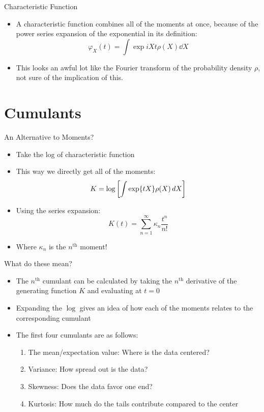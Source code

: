 \documentclass{beamer}
\begin{document}
\begin{frame}{Characteristic Function}
  \begin{itemize}
  \item A characteristic function combines all of the moments at once, because of the power series expansion of the exponential in its definition:
    \begin{equation}
      \varphi_X(t)=\int\exp{iXt}\rho(X)\dd{X}
    \end{equation}
  \item This looks an awful lot like the Fourier transform of the probability density $\rho$, not sure of the implication of this.
  \end{itemize}
\end{frame}

\section{Cumulants}
\begin{frame}{An Alternative to Moments?}
  \begin{itemize}
  \item Take the log of characteristic function
  \item This way we directly get all of the moments:
    \begin{equation}
      K=\log\qty[\int\exp{tX}\rho(X)\dd{X}]
    \end{equation}
  \item Using the series expansion:
    \begin{equation}
      K(t)=\sum_{n=1}^\infty\kappa_n\frac{t^n}{n!}
    \end{equation}
  \item Where $\kappa_n$ is the $n^\text{th}$ moment!
  \end{itemize}
\end{frame}
\begin{frame}{What do these mean?}
  \begin{itemize}
  \item The $n^\text{th}$ cumulant can be calculated by taking the $n^\text{th}$ derivative of the generating function $K$ and evaluating at $t=0$
  \item Expanding the $\log$ gives an idea of how each of the moments relates to the corresponding cumulant
  \item The first four cumulants are as follows:
    \begin{enumerate}
    \item The mean/expectation value: Where is the data centered?
    \item Variance: How spread out is the data?
    \item Skewness: Does the data favor one end?
    \item Kurtosis: How much do the tails contribute compared to the center
    \end{enumerate}
  \end{itemize}
\end{frame}
\end{document}
